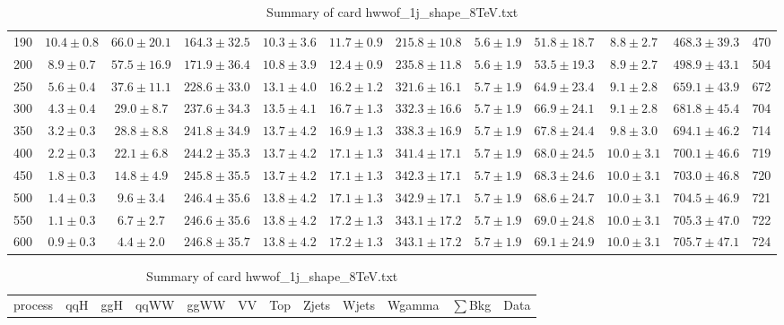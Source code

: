 \begin{table}
{\begin{center}
\begin{tabular}{l | c c | c c c c c c c | c c}
190 & $10.4\pm0.8$ & $66.0\pm20.1$ & $164.3\pm32.5$ & $10.3\pm3.6$ & $11.7\pm0.9$ & $215.8\pm10.8$ & $5.6\pm1.9$ & $51.8\pm18.7$ & $8.8\pm2.7$ & $468.3\pm39.3$ & 470 \\
200 & $8.9\pm0.7$ & $57.5\pm16.9$ & $171.9\pm36.4$ & $10.8\pm3.9$ & $12.4\pm0.9$ & $235.8\pm11.8$ & $5.6\pm1.9$ & $53.5\pm19.3$ & $8.9\pm2.7$ & $498.9\pm43.1$ & 504 \\
250 & $5.6\pm0.4$ & $37.6\pm11.1$ & $228.6\pm33.0$ & $13.1\pm4.0$ & $16.2\pm1.2$ & $321.6\pm16.1$ & $5.7\pm1.9$ & $64.9\pm23.4$ & $9.1\pm2.8$ & $659.1\pm43.9$ & 672 \\
300 & $4.3\pm0.4$ & $29.0\pm8.7$ & $237.6\pm34.3$ & $13.5\pm4.1$ & $16.7\pm1.3$ & $332.3\pm16.6$ & $5.7\pm1.9$ & $66.9\pm24.1$ & $9.1\pm2.8$ & $681.8\pm45.4$ & 704 \\
350 & $3.2\pm0.3$ & $28.8\pm8.8$ & $241.8\pm34.9$ & $13.7\pm4.2$ & $16.9\pm1.3$ & $338.3\pm16.9$ & $5.7\pm1.9$ & $67.8\pm24.4$ & $9.8\pm3.0$ & $694.1\pm46.2$ & 714 \\
400 & $2.2\pm0.3$ & $22.1\pm6.8$ & $244.2\pm35.3$ & $13.7\pm4.2$ & $17.1\pm1.3$ & $341.4\pm17.1$ & $5.7\pm1.9$ & $68.0\pm24.5$ & $10.0\pm3.1$ & $700.1\pm46.6$ & 719 \\
450 & $1.8\pm0.3$ & $14.8\pm4.9$ & $245.8\pm35.5$ & $13.7\pm4.2$ & $17.1\pm1.3$ & $342.3\pm17.1$ & $5.7\pm1.9$ & $68.3\pm24.6$ & $10.0\pm3.1$ & $703.0\pm46.8$ & 720 \\
500 & $1.4\pm0.3$ & $9.6\pm3.4$ & $246.4\pm35.6$ & $13.8\pm4.2$ & $17.1\pm1.3$ & $342.9\pm17.1$ & $5.7\pm1.9$ & $68.6\pm24.7$ & $10.0\pm3.1$ & $704.5\pm46.9$ & 721 \\
550 & $1.1\pm0.3$ & $6.7\pm2.7$ & $246.6\pm35.6$ & $13.8\pm4.2$ & $17.2\pm1.3$ & $343.1\pm17.2$ & $5.7\pm1.9$ & $69.0\pm24.8$ & $10.0\pm3.1$ & $705.3\pm47.0$ & 722 \\
600 & $0.9\pm0.3$ & $4.4\pm2.0$ & $246.8\pm35.7$ & $13.8\pm4.2$ & $17.2\pm1.3$ & $343.1\pm17.2$ & $5.7\pm1.9$ & $69.1\pm24.9$ & $10.0\pm3.1$ & $705.7\pm47.1$ & 724 \\
\hline
\end{tabular}
\end{center}
}
\caption{Summary of card hwwof\_1j\_shape\_8TeV.txt}
{%
 \tiny
 \begin{center}
 \begin{tabular}{l | c c | c c c c c c c | c c}
 \hline
 process & qqH & ggH & qqWW & ggWW & VV & Top & Zjets & Wjets & Wgamma & $\sum$Bkg & Data \\

\end{tabular}
\end{center}}
\end{table}
